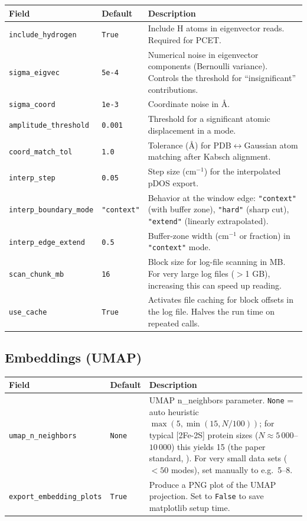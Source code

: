 \documentclass[11pt,a4paper,twoside]{article}
\theoremstyle{remark}
\begin{document}
\begin{longtable}{p{} p{} p{}}
\toprule
\textbf{Field} & \textbf{Default} & \textbf{Description} \\
\midrule
\endhead
\texttt{include\_hydrogen} & \texttt{True} & Include H atoms in
  eigenvector reads. Required for PCET. \\
\texttt{sigma\_eigvec}    & \texttt{5e-4}  & Numerical noise in
  eigenvector components (Bernoulli variance). Controls the
  threshold for ``insignificant'' contributions. \\
\texttt{sigma\_coord}     & \texttt{1e-3} & Coordinate noise in
  \AA{}. \\
\texttt{amplitude\_threshold} & \texttt{0.001} & Threshold for a
  significant atomic displacement in a mode. \\
\texttt{coord\_match\_tol} & \texttt{1.0}   & Tolerance (\AA{}) for
  PDB$\leftrightarrow$Gaussian atom matching after Kabsch alignment. \\
\texttt{interp\_step}     & \texttt{0.05}  & Step size (cm$^{-1}$)
  for the interpolated pDOS export. \\
\texttt{interp\_boundary\_mode} & \texttt{"context"} & Behavior at
  the window edge: \texttt{"context"} (with buffer zone),
  \texttt{"hard"} (sharp cut), \texttt{"extend"} (linearly
  extrapolated). \\
\texttt{interp\_edge\_extend} & \texttt{0.5} & Buffer-zone width
  (cm$^{-1}$ or fraction) in \texttt{"context"} mode. \\
\texttt{scan\_chunk\_mb}  & \texttt{16}    & Block size for log-file
  scanning in MB. For very large log files ($>$1 GB), increasing
  this can speed up reading. \\
\texttt{use\_cache}       & \texttt{True}  & Activates file caching
  for block offsets in the log file. Halves the run time on
  repeated calls. \\
\bottomrule
\end{longtable}

\subsection{Embeddings (UMAP)}

\begin{longtable}{p{} p{} p{}}
\toprule
\textbf{Field} & \textbf{Default} & \textbf{Description} \\
\midrule
\endhead
\texttt{umap\_n\_neighbors} & \texttt{None} & UMAP n\_neighbors
  parameter. \texttt{None} = auto heuristic
  $\max(5, \min(15, N/100))$; for typical [2Fe-2S] protein sizes
  ($N \approx 5\,000$--$10\,000$) this yields 15 (the paper
  standard, \cite{McInnes2018}). For very small data sets
  ($< 50$ modes), set manually to e.g.\ 5--8. \\
\texttt{export\_embedding\_plots} & \texttt{True} & Produce a PNG
  plot of the UMAP projection. Set to \texttt{False} to save
  matplotlib setup time. \\
\bottomrule
\end{longtable}
\end{document}
